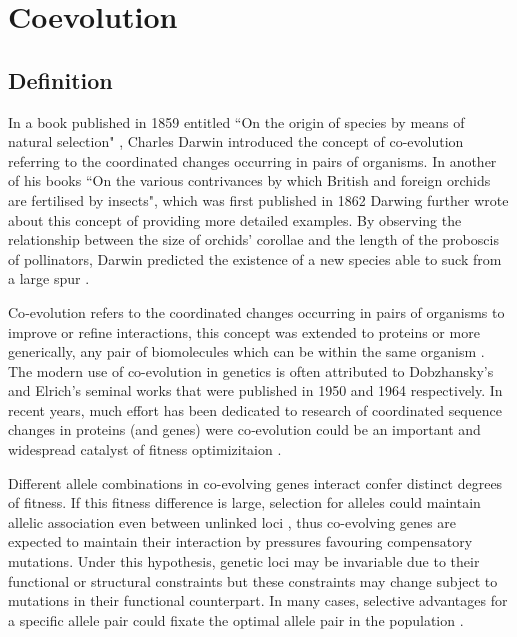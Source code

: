 \section{Coevolution}


\subsection{Definition}

In a book published in 1859 entitled ``On the origin of species by means of natural selection" \cite{darwin1859origin}, Charles Darwin introduced the concept of co-evolution referring to the coordinated changes occurring in pairs of organisms.
In another of his books ``On the various contrivances by which British and foreign orchids are fertilised by insects", which was first published in 1862  \cite{darwin1877various} Darwing further wrote about this concept of providing more detailed examples.
By observing the relationship between the size of orchids' corollae and the length of the proboscis of pollinators, Darwin predicted the existence of a new species able to suck from a large spur \cite{de2013emerging}.

Co‐evolution refers to the coordinated changes occurring in pairs of organisms to improve or refine interactions, this concept was extended to proteins  or more generically, any pair of biomolecules which can be within the same organism \cite{de2013emerging}.
The modern use of co-evolution in genetics is often attributed to Dobzhansky's \cite{dobzhansky1950genetics} and Elrich's \cite{ehrlich1964butterflies} seminal works that were published in 1950 and 1964 respectively.
In recent years, much effort has been dedicated to research of coordinated sequence changes in proteins (and genes) were co‐evolution could be an important and widespread catalyst of fitness optimizitaion \cite{de2013emerging}.

Different allele combinations in co-evolving genes interact confer distinct degrees of fitness. 
If this fitness difference is large, selection for alleles could maintain allelic association even between unlinked loci \cite{rohlfs2010detecting}, thus co-evolving genes are expected to maintain their interaction by pressures favouring compensatory mutations. \cite{rohlfs2010detecting}
Under this hypothesis, genetic loci may be invariable due to their functional or structural constraints but these constraints may change subject to mutations in their functional counterpart. \cite{fares2006novel}
In many cases, selective advantages for a specific allele pair could fixate the optimal allele pair in the population \cite{rohlfs2010detecting}.

